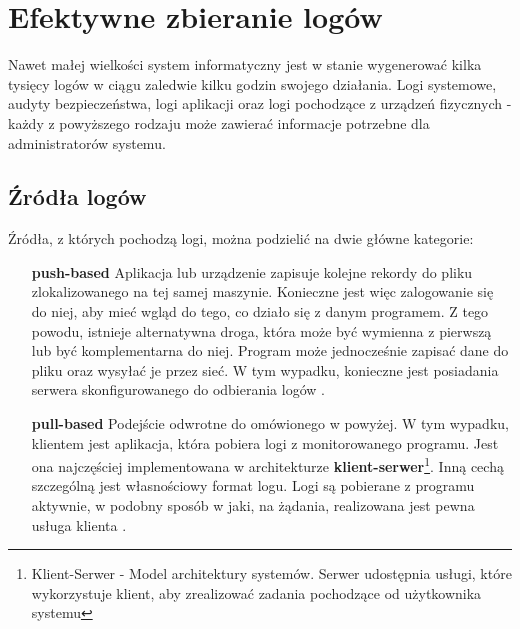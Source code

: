 \section{Efektywne zbieranie logów}
\label{chapter:logs:collecting}

    Nawet małej wielkości system informatyczny jest w stanie wygenerować kilka tysięcy logów w ciągu
    zaledwie kilku godzin swojego działania. Logi systemowe, audyty bezpieczeństwa, logi aplikacji oraz
    logi pochodzące z urządzeń fizycznych - każdy z powyższego rodzaju może zawierać informacje potrzebne
    dla administratorów systemu. 
    
    \subsection{Źródła logów}
    \label{chapter:logs:collecting:source}
    Źródła, z których pochodzą logi, można podzielić na dwie główne kategorie:
    \begin{itemize}
        \item[\textbf{push-based}]
            Aplikacja lub urządzenie zapisuje kolejne rekordy do pliku zlokalizowanego
            na tej samej maszynie. Konieczne jest więc zalogowanie się do niej, aby 
            mieć wgląd do tego, co działo się z danym programem. Z tego powodu, istnieje
            alternatywna droga, która może być wymienna z pierwszą lub być komplementarna do niej.
            Program może jednocześnie zapisać dane do pliku oraz wysyłać je przez sieć. W tym
            wypadku, konieczne jest posiadania serwera skonfigurowanego do odbierania logów 
            \cite{logging_log_management}.
        \item[\textbf{pull-based}]
            Podejście odwrotne do omówionego w powyżej. W tym wypadku,
            klientem jest aplikacja, która pobiera logi z monitorowanego programu. Jest ona najczęściej
            implementowana w architekturze \textbf{klient-serwer}\footnote{Klient-Serwer - Model architektury
                systemów. Serwer udostępnia usługi, które wykorzystuje klient, aby zrealizować zadania
                pochodzące od użytkownika systemu}. Inną cechą szczególną jest własnościowy format logu.
            Logi są pobierane z programu aktywnie, w podobny sposób w jaki, na żądania, realizowana
            jest pewna usługa klienta \cite{logging_log_management}.
    \end{itemize}
    

